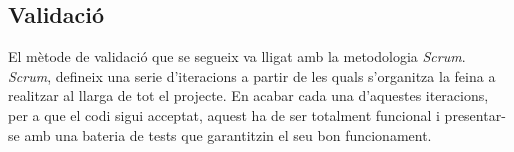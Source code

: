 \subsection{Validació}
El mètode de validació que se segueix va lligat amb la metodologia \textit{Scrum}.\\
\textit{Scrum}, defineix una serie d'iteracions a partir de les quals s'organitza la feina a realitzar al llarga de tot el projecte. En acabar cada una d'aquestes iteracions, per a que el codi sigui acceptat,  aquest ha de ser totalment funcional i presentar-se amb una bateria de tests que garantitzin el seu bon funcionament.
